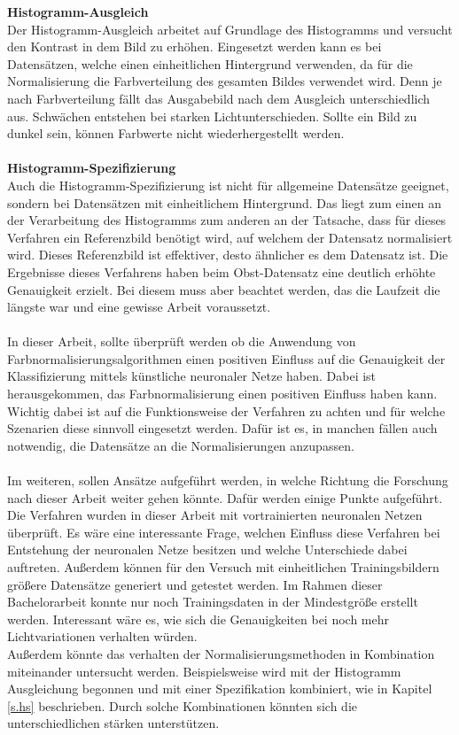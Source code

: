 \textbf{Histogramm-Ausgleich}\\
Der Histogramm-Ausgleich arbeitet auf Grundlage des Histogramms und versucht den Kontrast in dem Bild zu erhöhen. Eingesetzt werden kann es bei Datensätzen, welche einen einheitlichen Hintergrund verwenden, da für die Normalisierung die Farbverteilung des gesamten Bildes verwendet wird. Denn je nach Farbverteilung fällt das Ausgabebild nach dem Ausgleich unterschiedlich aus. Schwächen entstehen bei starken Lichtunterschieden. Sollte ein Bild zu dunkel sein, können Farbwerte nicht wiederhergestellt werden.\\\\
\textbf{Histogramm-Spezifizierung}\\
Auch die Histogramm-Spezifizierung ist nicht für allgemeine Datensätze geeignet, sondern bei Datensätzen mit einheitlichem Hintergrund. Das liegt zum einen an der Verarbeitung des Histogramms zum anderen an der Tatsache, dass für dieses Verfahren ein Referenzbild benötigt wird, auf welchem der Datensatz normalisiert wird. Dieses Referenzbild ist effektiver, desto ähnlicher es dem Datensatz ist. Die Ergebnisse dieses Verfahrens haben beim Obst-Datensatz eine deutlich erhöhte Genauigkeit erzielt. Bei diesem muss aber beachtet werden, das die Laufzeit die längste war und eine gewisse Arbeit voraussetzt.\\\\
In dieser Arbeit, sollte überprüft werden ob die Anwendung von Farbnormalisierungsalgorithmen einen positiven Einfluss auf die Genauigkeit der Klassifizierung mittels künstliche neuronaler Netze haben. Dabei ist herausgekommen, das Farbnormalisierung einen positiven Einfluss haben kann. Wichtig dabei ist auf die Funktionsweise der Verfahren zu achten und für welche Szenarien diese sinnvoll eingesetzt werden. Dafür ist es, in manchen fällen auch notwendig, die Datensätze an die Normalisierungen anzupassen.\\\\
Im  weiteren, sollen Ansätze aufgeführt werden, in welche Richtung die Forschung nach dieser Arbeit weiter gehen könnte. Dafür werden einige Punkte aufgeführt. Die Verfahren wurden in dieser Arbeit mit vortrainierten neuronalen Netzen überprüft. Es wäre eine interessante Frage, welchen Einfluss diese Verfahren bei Entstehung der neuronalen Netze besitzen und welche Unterschiede dabei auftreten. Außerdem können für den Versuch mit einheitlichen Trainingsbildern größere Datensätze generiert und getestet werden. Im Rahmen dieser Bachelorarbeit konnte nur noch Trainingsdaten in der Mindestgröße erstellt werden. Interessant wäre es, wie sich die Genauigkeiten bei noch mehr Lichtvariationen verhalten würden.\\
Außerdem könnte das verhalten der Normalisierungsmethoden in Kombination miteinander untersucht werden. Beispielsweise wird mit der Histogramm Ausgleichung begonnen und mit einer Spezifikation kombiniert, wie in Kapitel \ref{s.hs} beschrieben. Durch solche Kombinationen könnten sich die unterschiedlichen stärken unterstützen.  
